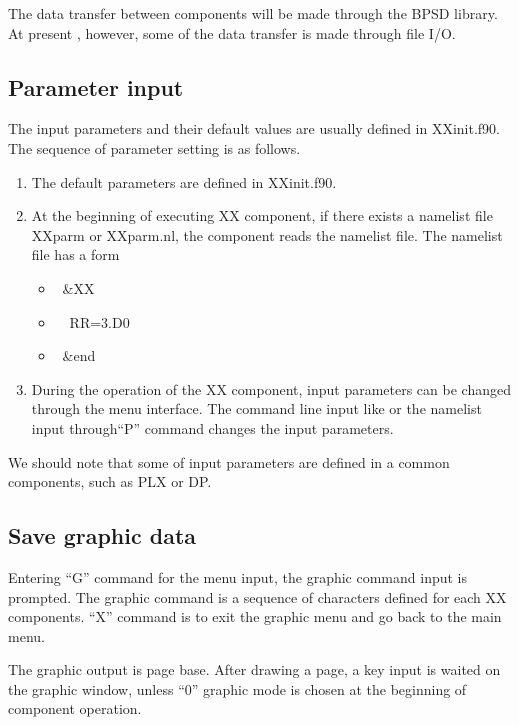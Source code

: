 \documentclass[11pt]{article}
\begin{document}
The data transfer between components will be made through the BPSD
library.  At present , however, some of the data transfer is made
through file I/O.  

\subsection{Parameter input}

The input parameters and their default values are usually defined in
XXinit.f90.  The sequence of parameter setting is as follows.

\begin{enumerate}
\item
The default parameters are defined in XXinit.f90.
\item
At the beginning of executing XX component, if there exists a namelist file
XXparm or XXparm.nl, the component reads the namelist file. The
namelist file has a form
\begin{itemize}
\item[] \ \&XX
\item[] \ \ RR=3.D0
\item[] \ \&end
\end{itemize}
\item
During the operation of the XX component, input parameters can be
changed through the menu interface.  The command line input like
 or the namelist input through``P'' command changes the
input parameters.
\end{enumerate}

We should note that some of input parameters are defined in a common
components, such as PLX or DP. 

\subsection{Save graphic data}

Entering ``G'' command for the menu input, the graphic command input
is prompted.  The graphic command is a sequence of characters defined
for each XX components.  ``X'' command is to exit the graphic menu and
go back to the main menu. 

The graphic output is page base.  After drawing a page, a key input is
waited on the graphic window, unless ``0'' graphic mode is chosen at
the beginning of component operation. 
\end{document}
